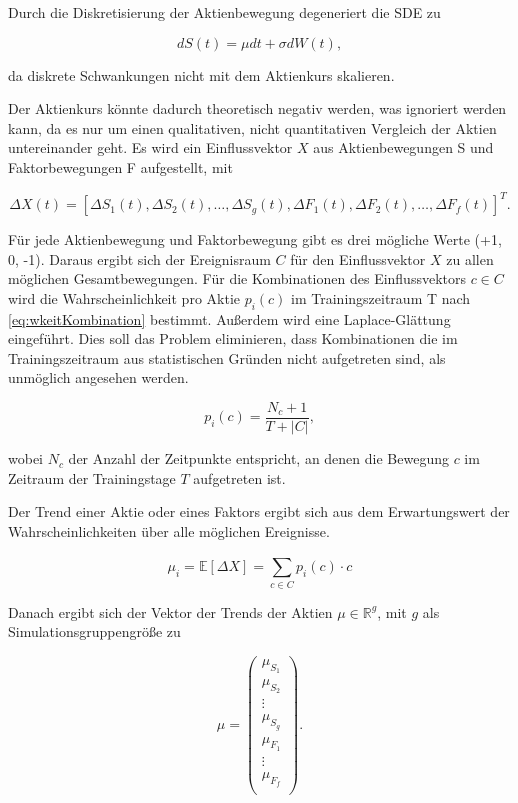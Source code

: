 Durch die Diskretisierung der Aktienbewegung degeneriert die \ac{SDE} zu

\begin{equation}\label{eq:degen_sde}
    dS(t) = \mu dt + \sigma dW(t),
\end{equation}

da diskrete Schwankungen nicht mit dem Aktienkurs skalieren.

Der Aktienkurs könnte dadurch theoretisch negativ werden, was ignoriert werden kann, da es nur um einen qualitativen, nicht quantitativen Vergleich der Aktien untereinander geht.
Es wird ein Einflussvektor $X$ aus Aktienbewegungen S und Faktorbewegungen F aufgestellt, mit

\[
    \Delta X(t) = {[\Delta S_1(t), \Delta S_2(t), \dots, \Delta S_g(t), \Delta F_1(t), \Delta F_2(t), \dots, \Delta F_f(t)]}^T.
\]

Für jede Aktienbewegung und Faktorbewegung gibt es drei mögliche Werte (+1, 0, -1). Daraus ergibt sich der Ereignisraum $C$ für den Einflussvektor $X$ zu allen möglichen Gesamtbewegungen. Für die Kombinationen des Einflussvektors $c \in C$ wird die Wahrscheinlichkeit pro Aktie $p_i(c)$ im Trainingszeitraum T nach \cref{eq:wkeitKombination} bestimmt. Außerdem wird eine Laplace-Glättung eingeführt. Dies soll das Problem eliminieren, dass Kombinationen die im Trainingszeitraum aus statistischen Gründen nicht aufgetreten sind, als unmöglich angesehen werden.

\begin{equation}\label{eq:wkeitKombination}
    p_i(c) = \frac{N_c+1}{T + |C|},
\end{equation}

wobei $N_c$ der Anzahl der Zeitpunkte entspricht, an denen die Bewegung $c$ im Zeitraum der Trainingstage $T$ aufgetreten ist.

Der Trend einer Aktie oder eines Faktors ergibt sich aus dem Erwartungswert der Wahrscheinlichkeiten über alle möglichen Ereignisse.

\[
    \mu_i = \mathbb{E}[\Delta X] = \sum_{c \in C}^{} p_i(c) \cdot c
\]

Danach ergibt sich der Vektor der Trends der Aktien $\mu \in \mathbb{R}^g$, mit $g$ als Simulationsgruppengröße zu

\[
    \mu =
    \begin{pmatrix}
        \mu_{S_1} \\
        \mu_{S_2} \\
        \vdots    \\
        \mu_{S_g} \\
        \mu_{F_1} \\
        \vdots    \\
        \mu_{F_f} \\
    \end{pmatrix}.
\]

